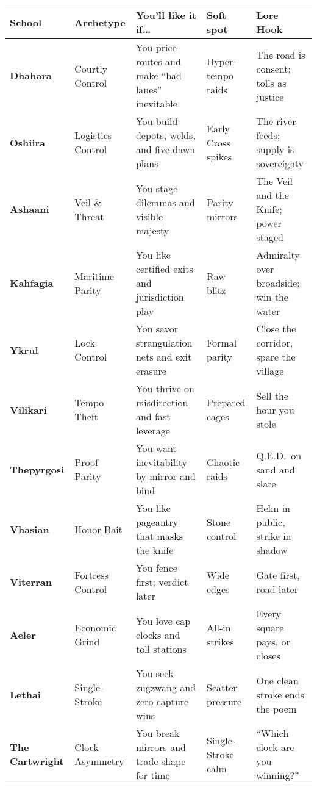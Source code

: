 \documentclass[11pt]{article}
\begin{document}
\begin{tabularx}{\linewidth}{@{}>{\bfseries}p{2.1cm} L L L L@{}}
\toprule
School & Archetype & You’ll like it if… & Soft spot & Lore Hook \\
\midrule
Dhahara    & Courtly Control   & You price routes and make “bad lanes” inevitable & Hyper-tempo raids & The road is consent; tolls as justice \\
Oshiira    & Logistics Control & You build depots, welds, and five-dawn plans     & Early Cross spikes & The river feeds; supply is sovereignty \\
Ashaani    & Veil \& Threat    & You stage dilemmas and visible majesty           & Parity mirrors     & The Veil and the Knife; power staged \\
Kahfagia   & Maritime Parity   & You like certified exits and jurisdiction play   & Raw blitz          & Admiralty over broadside; win the water \\
Ykrul      & Lock Control      & You savor strangulation nets and exit erasure    & Formal parity      & Close the corridor, spare the village \\
Vilikari   & Tempo Theft       & You thrive on misdirection and fast leverage     & Prepared cages     & Sell the hour you stole \\
Thepyrgosi & Proof Parity      & You want inevitability by mirror and bind        & Chaotic raids      & Q.E.D.\ on sand and slate \\
Vhasian    & Honor Bait        & You like pageantry that masks the knife          & Stone control      & Helm in public, strike in shadow \\
Viterran   & Fortress Control  & You fence first; verdict later                   & Wide edges         & Gate first, road later \\
Aeler      & Economic Grind    & You love cap clocks and toll stations            & All-in strikes     & Every square pays, or closes \\
Lethai     & Single-Stroke     & You seek zugzwang and zero-capture wins          & Scatter pressure   & One clean stroke ends the poem \\
The Cartwright & Clock Asymmetry   & You break mirrors and trade shape for time       & Single-Stroke calm & “Which clock are you winning?” \\
\bottomrule
\end{tabularx}

\normalsize

\clearpage
\end{document}
